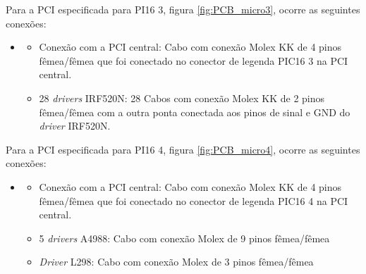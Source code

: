 Para a PCI especificada para PI16 3, figura \ref{fig:PCB_micro3}, ocorre as seguintes conexões:

\begin{itemize}
    \item[]
    \begin{itemize}
    \item Conexão com a PCI central: Cabo com conexão Molex KK de 4 pinos fêmea/fêmea que foi conectado no conector de legenda PIC16 3 na PCI central.
    \item 28 \textit{drivers} IRF520N: 28 Cabos com conexão Molex KK de 2 pinos fêmea/fêmea com a outra ponta conectada aos pinos de sinal e GND do \textit{driver} IRF520N.
\end{itemize}
\end{itemize}


Para a PCI especificada para PI16 4, figura \ref{fig:PCB_micro4}, ocorre as seguintes conexões:

\begin{itemize}
    \item[]
    \begin{itemize}
    \item Conexão com a PCI central: Cabo com conexão Molex KK de 4 pinos fêmea/fêmea que foi conectado no conector de legenda PIC16 4 na PCI central.
    \item 5 \textit{drivers} A4988:  Cabo com conexão Molex de 9 pinos fêmea/fêmea
    \item \textit{Driver} L298: Cabo com conexão Molex de 3 pinos fêmea/fêmea
\end{itemize}
\end{itemize}



